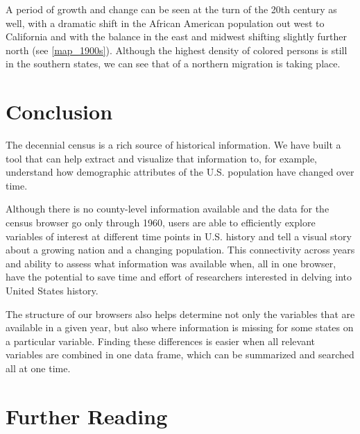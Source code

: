 \documentclass[DIV=calc, paper=a4, fontsize=10pt, twocolumn]{scrartcl}\usepackage[]{graphicx}\usepackage[]{color}
\begin{document}
A period of growth and change can be seen at the turn of the 20th century as well, with a dramatic shift in the African American population out west to California and with the balance in the east and midwest shifting slightly further north (see \autoref{map_1900s}). Although the highest density of colored persons is still in the southern states, we can see that of a northern migration is taking place.

\section*{Conclusion}
The decennial census is a rich source of historical information. We have built a tool that can help extract and visualize that information to, for example, understand how demographic attributes of the U.S. population have changed over time.

Although there is no county-level information available and the data for the census browser go only through 1960, users are able to efficiently explore variables of interest at different time points in U.S. history and tell a visual story about a growing nation and a changing population. This connectivity across years and ability to assess what information was available when, all in one browser, have the potential to save time and effort of researchers interested in delving into United States history.

The structure of our browsers also helps determine not only the variables that are available in a given year, but also where information is missing for some states on a particular variable. Finding these differences is easier when all relevant variables are combined in one data frame, which can be summarized and searched all at one time.


\section*{Further Reading}


\end{document}
